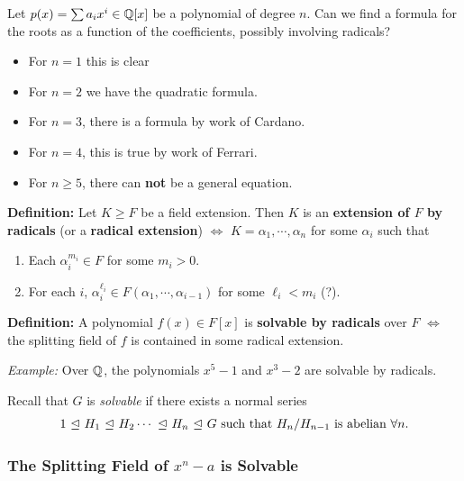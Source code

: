 Let \(p(x) = \sum a_i x^i \in {\mathbb{Q}}[x]\) be a polynomial of degree \(n\).
Can we find a formula for the roots as a function of the coefficients,
possibly involving radicals?

\begin{itemize}
\item
  For \(n = 1\) this is clear
\item
  For \(n=2\) we have the quadratic formula.
\item
  For \(n = 3\), there is a formula by work of Cardano.
\item
  For \(n = 4\), this is true by work of Ferrari.
\item
  For \(n \geq 5\), there can \textbf{not} be a general equation.
\end{itemize}

\textbf{Definition:} Let \(K \geq F\) be a field extension. Then \(K\)
is an \textbf{extension of \(F\) by radicals} (or a \textbf{radical
extension}) \(\iff\) \(K = \alpha_1, \cdots, \alpha_n\) for some
\(\alpha_i\) such that

\begin{enumerate}
\def\labelenumi{\arabic{enumi}.}
\item
  Each \(\alpha_i^{m_i} \in F\) for some \(m_i > 0\).
\item
  For each \(i\),
  \(\alpha_i^{\ell_i} \in F(\alpha_1, \cdots, \alpha_{i-1})\) for some
  \(\ell_i < m_i\) (?).
\end{enumerate}

\textbf{Definition:} A polynomial \(f(x) \in F[x]\) is \textbf{solvable
by radicals} over \(F\) \(\iff\) the splitting field of \(f\) is
contained in some radical extension.

\emph{Example:} Over \({\mathbb{Q}}\), the polynomials \(x^5-1\) and \(x^3-2\)
are solvable by radicals.

Recall that \(G\) is \emph{solvable} if there exists a normal series
\begin{align*}
1 {~\trianglelefteq~} H_1 {~\trianglelefteq~} H_2 \cdots {~\trianglelefteq~} H_n {~\trianglelefteq~} G
\text{ such that } H_n/H_{n-1} \text{ is abelian } \forall n
.\end{align*}

\hypertarget{the-splitting-field-of-xn-a-is-solvable}{%
\subsubsection{\texorpdfstring{The Splitting Field of \(x^n-a\) is
Solvable}{The Splitting Field of x\^{}n-a is Solvable}}\label{the-splitting-field-of-xn-a-is-solvable}}

